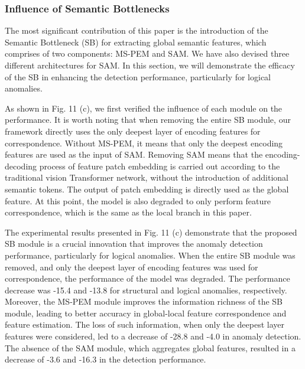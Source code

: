\documentclass[lettersize,journal]{IEEEtran}
\begin{document}
\subsubsection{Influence of Semantic Bottlenecks}


The most significant contribution of this paper is the introduction of the Semantic Bottleneck (SB) for extracting global semantic features, which comprises of two components: MS-PEM and SAM. We have also devised three different architectures for SAM. In this section, we will demonstrate the efficacy of the SB in enhancing the detection performance, particularly for logical anomalies.

As shown in Fig. 11 (c), we first verified the influence of each module on the performance. It is worth noting that when removing the entire SB module, our framework directly uses the only deepest layer of encoding features for correspondence. Without MS-PEM, it means that only the deepest encoding features are used as the input of SAM. Removing SAM means that the encoding-decoding process of feature patch embedding is carried out according to the traditional vision Transformer network, without the introduction of additional semantic tokens. The output of patch embedding is directly used as the global feature. At this point, the model is also degraded to only perform feature correspondence, which is the same as the local branch in this paper.


The experimental results presented in Fig. 11 (c) demonstrate that the proposed SB module is a crucial innovation that improves the anomaly detection performance, particularly for logical anomalies. When the entire SB module was removed, and only the deepest layer of encoding features was used for correspondence, the performance of the model was degraded. The performance decrease was -15.4 and -13.8 for structural and logical anomalies, respectively. Moreover, the MS-PEM module improves the information richness of the SB module, leading to better accuracy in global-local feature correspondence and feature estimation. The loss of such information, when only the deepest layer features were considered, led to a decrease of -28.8 and -4.0 in anomaly detection. The absence of the SAM module, which aggregates global features, resulted in a decrease of -3.6 and -16.3 in the detection performance.
\end{document}
